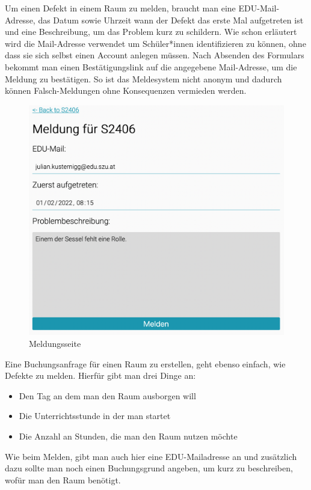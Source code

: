 Um einen Defekt in einem Raum zu melden, braucht man eine EDU-Mail-Adresse, das Datum sowie Uhrzeit wann der Defekt das erste Mal aufgetreten ist und eine Beschreibung, um das Problem kurz zu schildern. Wie schon erläutert wird die Mail-Adresse verwendet um Schüler*innen identifizieren zu können, ohne dass sie sich selbst einen Account anlegen müssen. Nach Absenden des Formulars bekommt man einen Bestätigungslink auf die angegebene Mail-Adresse, um die Meldung zu bestätigen. So ist das Meldesystem nicht anonym und dadurch können Falsch-Meldungen ohne Konsequenzen vermieden werden.

\begin{figure}[H]
    \centering
    \includegraphics[width=120mm]{media/WebComponents/Meldungsseite_light.png}
    \caption{Meldungsseite}
\end{figure}

Eine Buchungsanfrage für einen Raum zu erstellen, geht ebenso einfach, wie Defekte zu melden. Hierfür gibt man drei Dinge an: 
\begin{itemize}
    \item Den Tag an dem man den Raum ausborgen will
    \item Die Unterrichtsstunde in der man startet
    \item Die Anzahl an Stunden, die man den Raum nutzen möchte
\end{itemize} 
Wie beim Melden, gibt man auch hier eine EDU-Mailadresse an und zusätzlich dazu sollte man noch einen Buchungsgrund angeben, um kurz zu beschreiben, wofür man den Raum benötigt.

